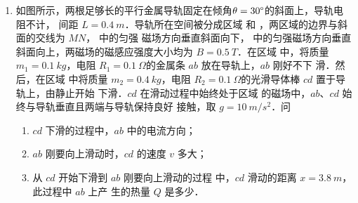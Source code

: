 \begin{enumerate}
\item 
{}
如图所示，两根足够长的平行金属导轨固定在倾角$ \theta =30 \degree $的斜面上，导轨电阻不计，
间距 $ L=0.4 \ m $．导轨所在空间被分成区域  和  ，两区域的边界与斜面的交线为 $ MN $，  中的匀强
磁场方向垂直斜面向下，  中的匀强磁场方向垂直斜面向上，两磁场的磁感应强度大小均为
$ B=0.5 \ T $．在区域  中，将质量 $ m_{1} =0.1 \ kg $，电阻 $ R_{1} =0.1 \ \Omega $的金属条 $ ab $ 放在导轨上，$ ab $ 刚好不下
滑．然后，在区域  中将质量 $ m_{2} =0.4 \ kg $，电阻 $ R_{2} =0.1 \ \Omega $的光滑导体棒 $ cd $ 置于导轨上，由静止开始
下滑．$ cd $ 在滑动过程中始终处于区域  的磁场中，$ ab $、$ cd $ 始终与导轨垂直且两端与导轨保持良好
接触，取 $ g=10 \ m/s^{2} $．问
\begin{enumerate}
\item
$ cd $ 下滑的过程中，$ ab $ 中的电流方向；

\item 
$ ab $ 刚要向上滑动时，$ cd $ 的速度 $ v $ 多大；

\item 
从 $ cd $ 开始下滑到 $ ab $ 刚要向上滑动的过程
中，$ cd $ 滑动的距离 $ x=3.8 \ m $，此过程中 $ ab $ 上产
生的热量 $ Q $ 是多少．


\end{enumerate}
\begin{figure}[h!]
\flushright

\end{figure}



\end{enumerate}

